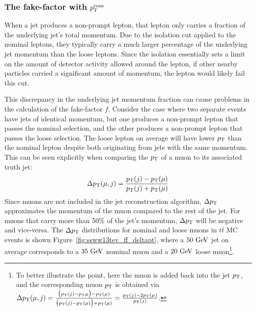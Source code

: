 %
\subsubsection{The fake-factor with $p_{\mathrm{T}}^{\textrm{cone}}$}\label{ssww13tev:ff_method_ptcone}
When a jet produces a non-prompt lepton, that lepton only carries a fraction of the underlying jet's total momentum.
Due to the isolation cut applied to the nominal leptons, they typically carry a much larger percentage of the underlying jet momentum than the loose leptons. %
Since the isolation essentially sets a limit on the amount of detector activity allowed around the lepton, if other nearby particles carried a significant amount of momentum, the lepton would likely fail this cut.

This discrepancy in the underlying jet momentum fraction can cause problems in the calculation of the fake-factor $f$.
Consider the case where two separate events have jets of identical momentum, but one produces a non-prompt lepton that passes the nominal selection, and the other produces a non-prompt lepton that passes the loose selection.
The loose lepton on average will have lower $p_{\mathrm{T}}$ than the nominal lepton despite both originating from jets with the same momentum.
This can be seen explicitly when comparing the $p_{\mathrm{T}}$ of a muon to its associated truth jet:
\begin{equation}
\Delta\pt(\mu,j) = \frac{\pt(j)-\pt(\mu)}{\pt(j)+\pt(\mu)}
\label{eq:ssww13tev_ff_deltapt}
\end{equation}
Since muons are not included in the jet reconstruction algorithm, $\Delta p_{\mathrm{T}}$ approximates the momentum of the muon compared to the rest of the jet.
For muons that carry more than 50\% of the jet's momentum, $\Delta p_{\mathrm{T}}$ will be negative and vice-versa.
The $\Delta p_{\mathrm{T}}$ distributions for nominal and loose muons in $t\bar{t}$ MC events is shown Figure~\ref{fig:ssww13tev_ff_deltapt}, where a $50\gev$ jet on average corresponds to a $35\gev$ nominal muon and a $20\gev$ loose muon\footnote{To better illustrate the point, here the muon is added back into the jet $p_{\mathrm{T}}$, and the corresponding muon $p_{\mathrm{T}}$ is obtained via $\Delta p_{\mathrm{T}}(\mu,j) = \frac{\big(p_{\mathrm{T}}(j)-p_{\mathrm{T}}{\mu}\big)-p_{\mathrm{T}}(\mu)}{\big(p_{\mathrm{T}}(j)-p_{\mathrm{T}}(\mu)\big)+p_{\mathrm{T}}(\mu)} = \frac{p_{\mathrm{T}}(j)-2p_{\mathrm{T}}(\mu)}{p_{\mathrm{T}}(j)}$.}.

